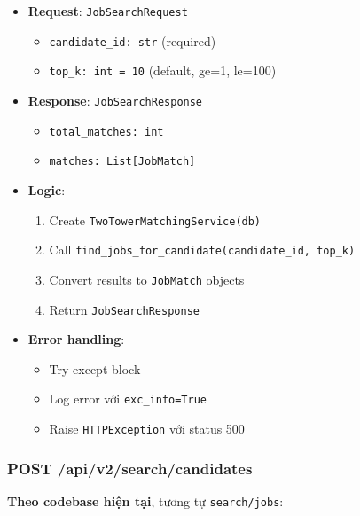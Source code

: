\begin{itemize}
    \item \textbf{Request}: \texttt{JobSearchRequest}
    \begin{itemize}
        \item \texttt{candidate\_id: str} (required)
        \item \texttt{top\_k: int = 10} (default, ge=1, le=100)
    \end{itemize}
    
    \item \textbf{Response}: \texttt{JobSearchResponse}
    \begin{itemize}
        \item \texttt{total\_matches: int}
        \item \texttt{matches: List[JobMatch]}
    \end{itemize}
    
    \item \textbf{Logic}:
    \begin{enumerate}
        \item Create \texttt{TwoTowerMatchingService(db)}
        \item Call \texttt{find\_jobs\_for\_candidate(candidate\_id, top\_k)}
        \item Convert results to \texttt{JobMatch} objects
        \item Return \texttt{JobSearchResponse}
    \end{enumerate}
    
    \item \textbf{Error handling}:
    \begin{itemize}
        \item Try-except block
        \item Log error với \texttt{exc\_info=True}
        \item Raise \texttt{HTTPException} với status 500
    \end{itemize}
\end{itemize}

\subsubsection{POST /api/v2/search/candidates}

\textbf{Theo codebase hiện tại}, tương tự \texttt{search/jobs}:

